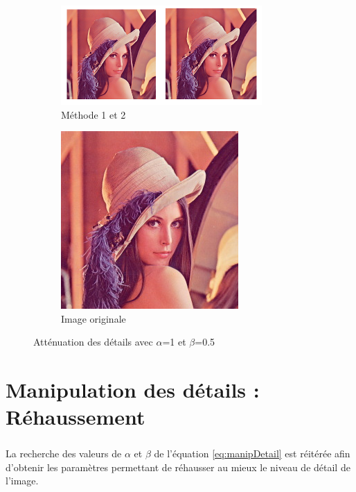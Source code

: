 \documentclass[twoside,UTF8]{EPURapport}
\begin{document}
\begin{figure}
        \centering
        \begin{subfigure}[b]{0.3\textwidth}
                \includegraphics[]{images/lena_1_05.png} 
                \caption{Méthode 1 et 2}
        \end{subfigure}
        
        \begin{subfigure}[b]{0.3\textwidth}
                \includegraphics[scale=0.5]{images/lena.jpg}
             	\caption{Image originale}
        \end{subfigure}
        \caption{Atténuation des détails avec $\alpha$=1 et $\beta$=0.5}
\end{figure}

\chapter{Manipulation des détails : Réhaussement}

\paragraph{}
La recherche des valeurs de $\alpha$ et $\beta$ de l'équation \ref{eq:manipDetail} est réitérée afin d'obtenir les paramètres permettant de réhausser au mieux le niveau de détail de l'image. 
\end{document}
